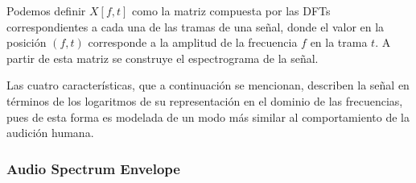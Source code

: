 Podemos definir $X[f,t]$ como la matriz compuesta por las DFTs correspondientes a cada una de las tramas de una señal, donde el valor en la posición $(f, t)$ corresponde a la amplitud de la frecuencia $f$ en la trama $t$.
A partir de esta matriz se construye el espectrograma de la señal.

Las cuatro características, que a continuación se mencionan, describen la señal en términos de los logaritmos de su representación en el dominio de las frecuencias, pues de esta forma es modelada de un modo más similar al comportamiento de la audición humana.

\subsubsection{Audio Spectrum Envelope}

